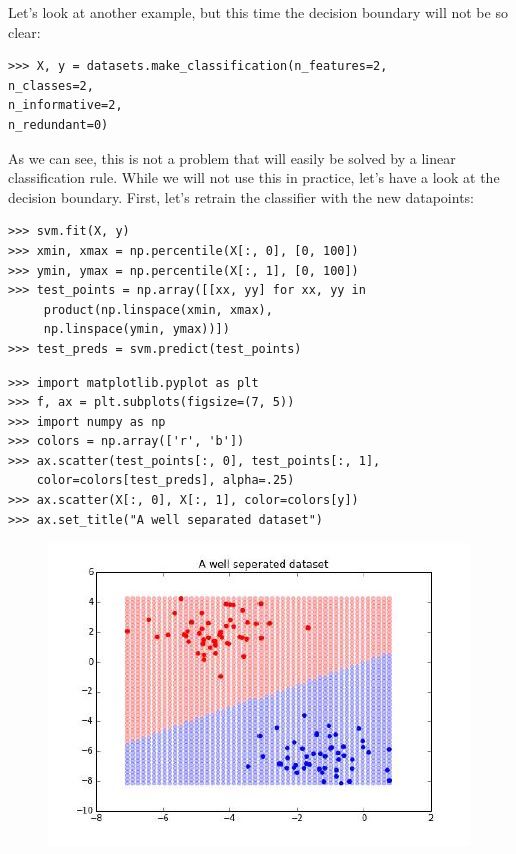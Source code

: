 \documentclass[SKL-MASTER.tex]{subfiles}
\begin{document}
Let's look at another example, but this time the decision boundary will not be so clear:
\begin{framed}
\begin{verbatim}
>>> X, y = datasets.make_classification(n_features=2,
n_classes=2,
n_informative=2,
n_redundant=0)
\end{verbatim}
\end{framed}
As we can see, this is not a problem that will easily be solved by a linear classification rule.
While we will not use this in practice, let's have a look at the decision boundary. First, let's
retrain the classifier with the new datapoints:
\begin{framed}
\begin{verbatim}
>>> svm.fit(X, y)
>>> xmin, xmax = np.percentile(X[:, 0], [0, 100])
>>> ymin, ymax = np.percentile(X[:, 1], [0, 100])
>>> test_points = np.array([[xx, yy] for xx, yy in
     product(np.linspace(xmin, xmax),
     np.linspace(ymin, ymax))])
>>> test_preds = svm.predict(test_points)
\end{verbatim}
\end{framed}
\begin{framed}
	\begin{verbatim}
>>> import matplotlib.pyplot as plt
>>> f, ax = plt.subplots(figsize=(7, 5))
>>> import numpy as np
>>> colors = np.array(['r', 'b'])
>>> ax.scatter(test_points[:, 0], test_points[:, 1],
    color=colors[test_preds], alpha=.25)
>>> ax.scatter(X[:, 0], X[:, 1], color=colors[y])
>>> ax.set_title("A well separated dataset")
\end{verbatim}
\end{framed}
\begin{figure}
\centering
\includegraphics[width=0.7\linewidth]{images/SKL43-SVMs-2}
\caption{}
\label{fig:SKL43-SVMs-2}
\end{figure}
\end{document}
